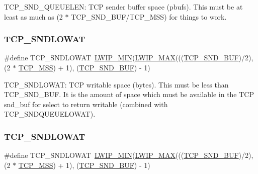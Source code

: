 T\+C\+P\+\_\+\+S\+N\+D\+\_\+\+Q\+U\+E\+U\+E\+L\+EN\+: T\+CP sender buffer space (pbufs). This must be at least as much as (2 $\ast$ T\+C\+P\+\_\+\+S\+N\+D\+\_\+\+B\+U\+F/\+T\+C\+P\+\_\+\+M\+SS) for things to work. \mbox{\label{group__lwip__opts__tcp_gae5c9866d7cd463ac7b36792182145aec}} 
\subsubsection{\texorpdfstring{T\+C\+P\+\_\+\+S\+N\+D\+L\+O\+W\+AT}{TCP\_SNDLOWAT}\hspace{0.1cm}{\footnotesize\ttfamily [1/2]}}
{\footnotesize\ttfamily \#define T\+C\+P\+\_\+\+S\+N\+D\+L\+O\+W\+AT~\hyperlink{openmote-cc2538_2lwip_2src_2include_2lwip_2def_8h_a748f5df614a3fc989e8900fd229d6e4e}{L\+W\+I\+P\+\_\+\+M\+IN}(\hyperlink{openmote-cc2538_2lwip_2src_2include_2lwip_2def_8h_a21ea174d374106caeafb4aa3a24fbd2b}{L\+W\+I\+P\+\_\+\+M\+AX}(((\hyperlink{openmote-cc2538_2lwip_2test_2unit_2lwipopts_8h_a871d111968d8c6c7880ff36b93c5c4dd}{T\+C\+P\+\_\+\+S\+N\+D\+\_\+\+B\+UF})/2), (2 $\ast$ \hyperlink{group__lwip__opts__tcp_gaf1ab7bb27860aa3677c387a2f3ba317b}{T\+C\+P\+\_\+\+M\+SS}) + 1), (\hyperlink{openmote-cc2538_2lwip_2test_2unit_2lwipopts_8h_a871d111968d8c6c7880ff36b93c5c4dd}{T\+C\+P\+\_\+\+S\+N\+D\+\_\+\+B\+UF}) -\/ 1)}

T\+C\+P\+\_\+\+S\+N\+D\+L\+O\+W\+AT\+: T\+CP writable space (bytes). This must be less than T\+C\+P\+\_\+\+S\+N\+D\+\_\+\+B\+UF. It is the amount of space which must be available in the T\+CP snd\+\_\+buf for select to return writable (combined with T\+C\+P\+\_\+\+S\+N\+D\+Q\+U\+E\+U\+E\+L\+O\+W\+AT). \mbox{\label{group__lwip__opts__tcp_gae5c9866d7cd463ac7b36792182145aec}} 
\subsubsection{\texorpdfstring{T\+C\+P\+\_\+\+S\+N\+D\+L\+O\+W\+AT}{TCP\_SNDLOWAT}\hspace{0.1cm}{\footnotesize\ttfamily [2/2]}}
{\footnotesize\ttfamily \#define T\+C\+P\+\_\+\+S\+N\+D\+L\+O\+W\+AT~\hyperlink{openmote-cc2538_2lwip_2src_2include_2lwip_2def_8h_a748f5df614a3fc989e8900fd229d6e4e}{L\+W\+I\+P\+\_\+\+M\+IN}(\hyperlink{openmote-cc2538_2lwip_2src_2include_2lwip_2def_8h_a21ea174d374106caeafb4aa3a24fbd2b}{L\+W\+I\+P\+\_\+\+M\+AX}(((\hyperlink{openmote-cc2538_2lwip_2test_2unit_2lwipopts_8h_a871d111968d8c6c7880ff36b93c5c4dd}{T\+C\+P\+\_\+\+S\+N\+D\+\_\+\+B\+UF})/2), (2 $\ast$ \hyperlink{group__lwip__opts__tcp_gaf1ab7bb27860aa3677c387a2f3ba317b}{T\+C\+P\+\_\+\+M\+SS}) + 1), (\hyperlink{openmote-cc2538_2lwip_2test_2unit_2lwipopts_8h_a871d111968d8c6c7880ff36b93c5c4dd}{T\+C\+P\+\_\+\+S\+N\+D\+\_\+\+B\+UF}) -\/ 1)}

